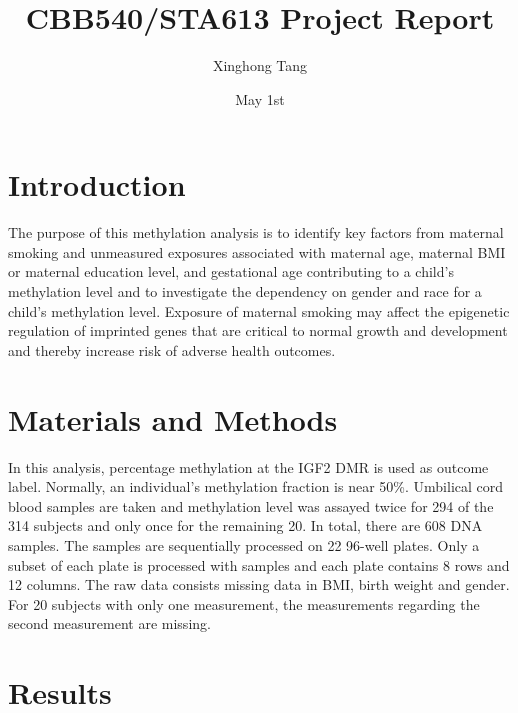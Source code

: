 \documentclass[a4paper,11pt]{article}
\theoremstyle{definition}
\begin{document}
	
\title{CBB540/STA613 Project Report}
\author{Xinghong Tang}
\date{May 1st}
\maketitle



\section{Introduction}

The purpose of this methylation analysis is to identify key factors from maternal smoking and unmeasured exposures associated with maternal age, maternal BMI or maternal education level, and gestational age contributing to a child's methylation level and to investigate the dependency on gender and race for a child's methylation level.
\newline
\newline
Exposure of maternal smoking may affect the epigenetic regulation of imprinted
genes that are critical to normal growth and development and thereby increase risk of adverse health outcomes.


\section{Materials and Methods}

In this analysis, percentage methylation at the IGF2 DMR is used as outcome label. Normally, an individual's methylation fraction is near 50\%. Umbilical
cord blood samples are taken and methylation level was assayed twice for 294 of the 314 subjects and only once for the remaining 20. In total, there are 608 DNA samples. The samples are sequentially processed on 22 96-well plates. Only a subset of each plate is processed with samples and each plate contains 8 rows and 12 columns.
\newline
\newline
The raw data consists missing data in BMI, birth weight and gender. For 20 subjects with only one measurement, the measurements regarding the second measurement are missing. 

\section{Results}
\end{document}
